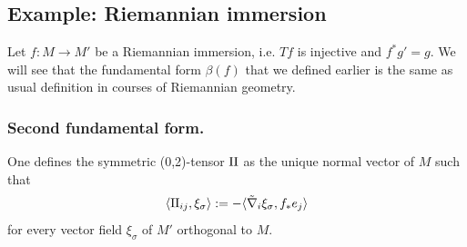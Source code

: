 \subsection{Example: Riemannian immersion}
\label{sec:orgc0334f0}
Let \(f: M \longrightarrow M'\) be a Riemannian immersion, i.e. \(Tf\) is injective and \(f^*g' = g\). We will
see that the fundamental form \(\beta(f)\) that we defined earlier is the same as usual definition in courses of Riemannian geometry.
\subsubsection{Second fundamental form.}
\label{sec:org1414732}
One defines the symmetric (0,2)-tensor \(\sff\) as the unique normal vector of \(M\) such that
\[
\langle \sff_{ij},\xi_\sigma \rangle:= -\langle \tilde\nabla_i\xi_\sigma, f_* e_j\rangle
\]
for every vector field \(\xi_\sigma\) of \(M'\) orthogonal to \(M\).

